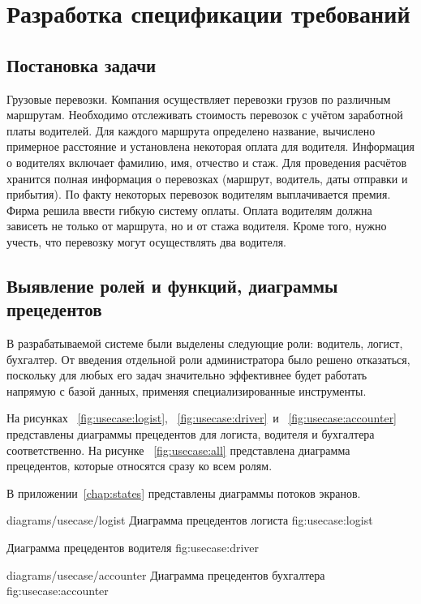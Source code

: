 \chapter{Разработка спецификации требований}
\label{chap:spec}

\section{Постановка задачи}
Грузовые перевозки. Компания осуществляет перевозки грузов 
по различным маршрутам. Необходимо отслеживать стоимость перевозок 
с учётом заработной платы водителей. Для каждого маршрута определено 
название, вычислено примерное расстояние и установлена некоторая оплата 
для водителя. Информация о водителях включает фамилию, имя, отчество и стаж. 
Для проведения расчётов хранится полная информация о перевозках 
(маршрут, водитель, даты отправки и прибытия). По факту некоторых 
перевозок водителям выплачивается премия. Фирма решила ввести гибкую 
систему оплаты. Оплата водителям должна зависеть не только от маршрута, 
но и от стажа водителя. Кроме того, нужно учесть, что перевозку 
могут осуществлять два водителя.

\section{Выявление ролей и функций, диаграммы прецедентов}
В разрабатываемой системе были выделены следующие роли: 
водитель, логист, бухгалтер. 
От введения отдельной роли администратора было решено отказаться, 
поскольку для любых его задач значительно эффективнее будет работать
напрямую с базой данных, применяя специализированные инструменты.

На рисунках
~\ref{fig:usecase:logist},
~\ref{fig:usecase:driver}~и
~\ref{fig:usecase:accounter} 
представлены диаграммы прецедентов для 
логиста, водителя и бухгалтера соответственно. На рисунке
~\ref{fig:usecase:all} 
представлена диаграмма прецедентов, которые относятся сразу ко всем ролям.

В приложении~\ref{chap:states} представлены диаграммы потоков экранов.

\image
    {diagrams/usecase/logist}
    {Диаграмма прецедентов логиста}
    {fig:usecase:logist}

    {Диаграмма прецедентов водителя}
    {fig:usecase:driver}

\image
    {diagrams/usecase/accounter}
    {Диаграмма прецедентов бухгалтера}
    {fig:usecase:accounter}

